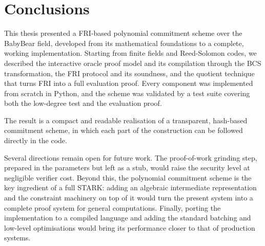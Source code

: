 \chapter{Conclusions}
\label{ch:conclusions}

This thesis presented a FRI-based polynomial commitment scheme over the
BabyBear field, developed from its mathematical foundations to a
complete, working implementation. Starting from finite fields and
Reed-Solomon codes, we described the interactive oracle proof model and
its compilation through the BCS transformation, the FRI protocol and its
soundness, and the quotient technique that turns FRI into a full
evaluation proof. Every component was implemented from scratch in
Python, and the scheme was validated by a test suite covering both the
low-degree test and the evaluation proof.

The result is a compact and readable realisation of a transparent,
hash-based commitment scheme, in which each part of the construction can
be followed directly in the code.

Several directions remain open for future work. The proof-of-work
grinding step, prepared in the parameters but left as a stub, would raise 
the security level at negligible verifier cost. Beyond this, the polynomial
commitment scheme is the key ingredient of a full STARK: adding an
algebraic intermediate representation and the constraint machinery on
top of it would turn the present system into a complete proof system for
general computations. Finally, porting the implementation to a compiled
language and adding the standard batching and low-level optimisations
would bring its performance closer to that of production systems.